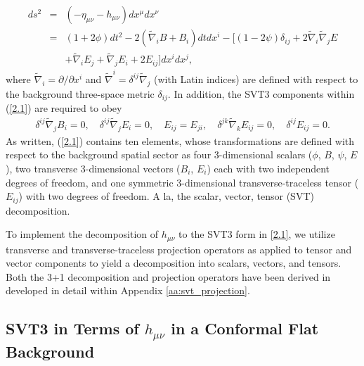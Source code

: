 \begin{eqnarray}
ds^2 &=&(-\eta_{\mu\nu}-h_{\mu\nu})dx^{\mu}dx^{\nu}
\nonumber\\
&=&(1+2\phi) dt^2 -2(\tilde{\nabla}_i B +B_i)dt dx^i - [(1-2\psi)\delta_{ij} +2\tilde{\nabla}_i\tilde{\nabla}_j E 
\nonumber\\
&&+ \tilde{\nabla}_i E_j + \tilde{\nabla}_j E_i + 2E_{ij}]dx^i dx^j,
\label{2.1}
\end{eqnarray}
%
where $\tilde{\nabla}_i=\partial/\partial x^i$ and  $\tilde{\nabla}^i=\delta^{ij}\tilde{\nabla}_j$  (with Latin indices) are defined with respect to the background three-space metric $\delta_{ij}$. In addition, the SVT3 components within (\ref{2.1}) are required to obey
%
\begin{eqnarray}
\delta^{ij}\tilde{\nabla}_j B_i = 0,\quad \delta^{ij}\tilde{\nabla}_j E_i = 0, \quad E_{ij}=E_{ji},\quad \delta^{jk}\tilde{\nabla}_kE_{ij} = 0, \quad \delta^{ij}E_{ij} = 0.
\label{2.2}
\label{APsvt3_rel}
\end{eqnarray}
%
As written, (\ref{2.1}) contains ten elements, whose transformations are defined with respect to the background spatial sector as four 3-dimensional scalars ($\phi$, $B$, $\psi$, $E$), two transverse 3-dimensional vectors ($B_i$, $E_i$) each with two independent degrees of freedom, and one symmetric 3-dimensional transverse-traceless tensor ($E_{ij}$) with two degrees of freedom. A la, the scalar, vector, tensor (SVT) decomposition. 

To implement the decomposition of $h_{\mu\nu}$ to the SVT3 form in \eqref{2.1}, we utilize transverse and transverse-traceless projection operators as applied to tensor and vector components to yield a decomposition into scalars, vectors, and tensors. Both the 3+1 decomposition and projection operators have been derived in developed in detail within Appendix \ref{aa:svt_projection}.
%
\subsection{SVT3 in Terms of $h_{\mu\nu}$ in a Conformal Flat Background}

